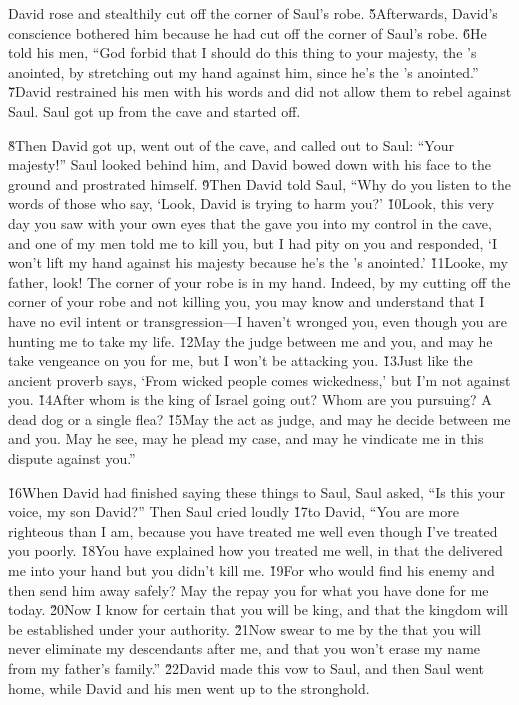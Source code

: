 David rose and stealthily cut off the corner of Saul's robe. \v{5}Afterwards, David's conscience bothered him because he had cut off the corner of Saul's robe. \v{6}He told his men, ``God forbid that I should do this thing to your majesty, the 's anointed, by stretching out my hand against him, since he's the 's anointed.'' \v{7}David restrained his men with his words and did not allow them to rebel against Saul. Saul got up from the cave and started off.

\v{8}Then David got up, went out of the cave, and called out to Saul: ``Your majesty!'' Saul looked behind him, and David bowed down with his face to the ground and prostrated himself. \v{9}Then David told Saul, ``Why do you listen to the words of those who say, `Look, David is trying to harm you?' \v{10}Look, this very day you saw with your own eyes that the  gave you into my control in the cave, and one of my men told me to kill you, but I had pity on you and responded, `I won't lift my hand against his majesty because he's the 's anointed.' \v{11}Looke, my father, look! The corner of your robe is in my hand. Indeed, by my cutting off the corner of your robe and not killing you, you may know and understand that I have no evil intent or transgression---I haven't wronged you, even though you are hunting me to take my life. \v{12}May the  judge between me and you, and may he take vengeance on you for me, but I won't be attacking you. \v{13}Just like the ancient proverb says, `From wicked people comes wickedness,' but I'm not against you. \v{14}After whom is the king of Israel going out? Whom are you pursuing? A dead dog or a single flea? \v{15}May the  act as judge, and may he decide between me and you. May he see, may he plead my case, and may he vindicate me in this dispute against you.''

\v{16}When David had finished saying these things to Saul, Saul asked, ``Is this your voice, my son David?'' Then Saul cried loudly \v{17}to David, ``You are more righteous than I am, because you have treated me well even though I've treated you poorly. \v{18}You have explained how you treated me well, in that the  delivered me into your hand but you didn't kill me. \v{19}For who would find his enemy and then send him away safely? May the  repay you for what you have done for me today. \v{20}Now I know for certain that you will be king, and that the kingdom will be established under your authority. \v{21}Now swear to me by the  that you will never eliminate my descendants after me, and that you won't erase my name from my father's family.'' \v{22}David made this vow to Saul, and then Saul went home, while David and his men went up to the stronghold.

